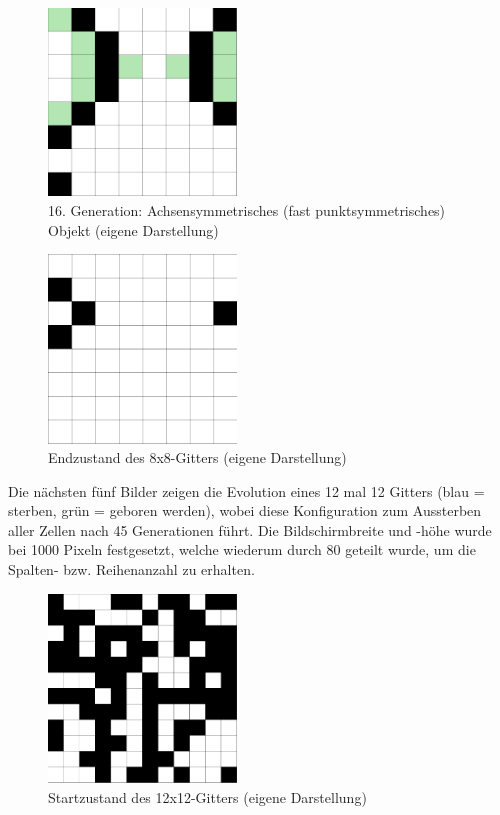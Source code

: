 \documentclass[../mciAusarbeitung.tex]{subfiles}
\begin{document}
\begin{figure}[H]
\includegraphics[width=5cm]{img/8x8_gen16.png}
\caption{16. Generation: Achsensymmetrisches (fast punktsymmetrisches) Objekt (eigene Darstellung)}
\label{8x8_gen16}
\end{figure}

\begin{figure}[H]
\includegraphics[width=5cm]{img/8x8_final.png}
\caption{Endzustand des 8x8-Gitters (eigene Darstellung)}
\label{8x8_final}
\end{figure}

Die nächsten fünf Bilder zeigen die Evolution eines 12 mal 12 Gitters (blau = sterben, grün = geboren werden), wobei diese Konfiguration zum Aussterben aller Zellen nach 45 Generationen führt. Die Bildschirmbreite und -höhe wurde bei 1000 Pixeln festgesetzt, welche wiederum durch 80 geteilt wurde, um die Spalten- bzw. Reihenanzahl zu erhalten.

\begin{figure}[H]
\includegraphics[width=5cm]{img/12x12_start.png}
\caption{Startzustand des 12x12-Gitters (eigene Darstellung)}
\label{12x12_start}
\end{figure}
\end{document}
